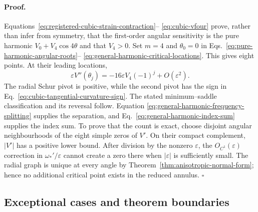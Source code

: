 \paragraph{Proof.}
Equations~\eqref{eq:registered-cubic-strain-contraction}--
\eqref{eq:cubic-vfour} prove, rather than infer from symmetry, that the
first-order angular sensitivity is the pure harmonic
\(V_0+V_4\cos4\theta\) and that \(V_4>0\).  Set \(m=4\) and
\(\theta_0=0\) in
Eqs.~\eqref{eq:pure-harmonic-angular-roots}--
\eqref{eq:general-harmonic-critical-locations}.  This gives eight points.
At their leading locations,
\begin{equation}
  \varepsilon V''(\theta_j)
  =-16\varepsilon V_4(-1)^j+O(\varepsilon^2).
  \label{eq:cubic-tangential-curvature-sign}
\end{equation}
The radial Schur pivot is positive, while the second pivot has the sign in
Eq.~\eqref{eq:cubic-tangential-curvature-sign}.  The stated minimum--saddle
classification and its reversal follow.  Equation
\eqref{eq:general-harmonic-frequency-splitting} supplies the separation, and
Eq.~\eqref{eq:general-harmonic-index-sum} supplies the index sum.
To prove that the count is exact, choose disjoint angular neighbourhoods of
the eight simple zeros of \(V'\).  On their compact complement,
\(\lvert V'\rvert\) has a positive lower bound.  After division by the
nonzero \(\varepsilon\), the \(O_{C^1}(\varepsilon)\) correction in
\(\omega_*'/\varepsilon\) cannot create a zero there when
\(\lvert\varepsilon\rvert\) is sufficiently small.  The radial graph is
unique at every angle by Theorem~\ref{thm:anisotropic-normal-form}; hence no
additional critical point exists in the reduced annulus.
\(\square\)

\subsection{Exceptional cases and theorem boundaries}

